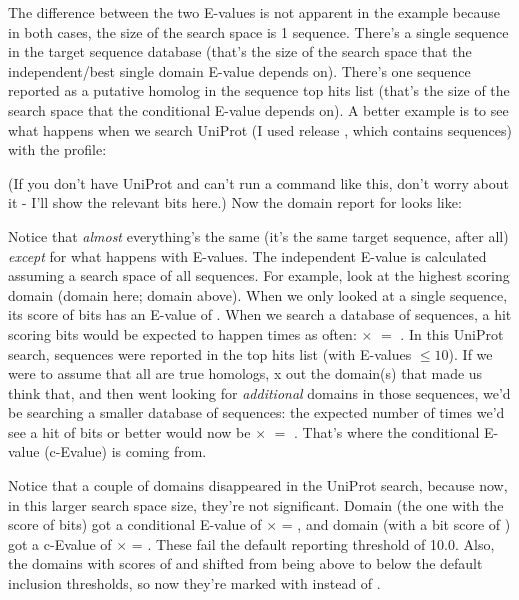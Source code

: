 The difference between the two E-values is not apparent in the
 example because in both cases, the size of the
search space is 1 sequence. There's a single sequence in the target
sequence database (that's the size of the search space that the
independent/best single domain E-value depends on). There's one
sequence reported as a putative homolog in the sequence top hits list
(that's the size of the search space that the conditional E-value
depends on). A better example is to see what happens when we search
UniProt (I used release \UNIrelease{}, which contains \UNInseq{} sequences) 
with the  profile:

   \vspace{1ex}
   \vspace{1ex}

(If you don't have UniProt and can't run a command like this, don't
worry about it - I'll show the relevant bits here.) Now the domain
report for  looks like:


Notice that \emph{almost} everything's the same (it's the same target
sequence, after all) \emph{except} for what happens with E-values. The
independent E-value is calculated assuming a search space of all
\UNInseq{} sequences. For example, look at the highest scoring domain
(domain \SFSmaxdomu{} here; domain \SFSmaxdom{} above). When we only looked at a single
sequence, its score of \SFSmaxsc{} bits has an E-value of \SFSievalue{}. When we
search a database of \UNInseq{} sequences, a hit scoring \SFSmaxsc{} bits would
be expected to happen \UNInseq{} times as often: \SFSievalue{} $\times$ \UNInseq{}
$=$ \SFSuievalue{}. In this UniProt
search, \SFSdomZ{} sequences were reported in the top hits list (with
E-values $\leq 10$). If we were to assume that all \SFSdomZ{} are true
homologs, x out the domain(s) that made us think that, and then went
looking for \emph{additional} domains in those \SFSdomZ{} sequences, we'd be
searching a smaller database of \SFSdomZ{} sequences: the expected number of
times we'd see a hit of \SFSmaxsc{} bits or better would now be \SFSievalue{} $\times$
\SFSdomZ{} $=$ \SFSucevalue. That's where the conditional E-value (c-Evalue) is
coming from.

Notice that a couple of domains disappeared in the UniProt search,
because now, in this larger search space size, they're not
significant. Domain \SFSaidx{} (the one with the score of \SFSascore{}
bits) got a conditional E-value of \SFSaevalue{} $\times$ \SFSdomZ{} =
\SFSauevalue{}, and domain \SFSbidx{} (with a bit score of
\SFSbscore{}) got a c-Evalue of \SFSbevalue{} $\times$ \SFSdomZ =
\SFSbuevalue{}. These fail the default reporting threshold of
10.0. Also, the domains with scores of \SFSainsig{} and \SFSbinsig{}
shifted from being above to below the default inclusion thresholds, so
now they're marked with  instead of \mono{!}.


